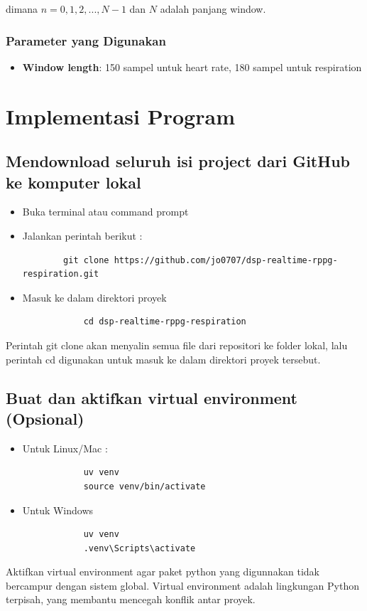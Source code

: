 \documentclass[11pt,a4paper]{article}
\begin{document}
dimana $n = 0, 1, 2, ..., N-1$ dan $N$ adalah panjang window.

\subsubsection{Parameter yang Digunakan}
\begin{itemize}
    \item \textbf{Window length}: 150 sampel untuk heart rate, 180 sampel untuk respiration
\end{itemize}


\section{Implementasi Program}

\subsection{Mendownload seluruh isi project dari GitHub ke komputer lokal}
    \begin{itemize}
        \item Buka terminal atau command prompt
        \item Jalankan perintah berikut : 
        \begin{lstlisting}
        git clone https://github.com/jo0707/dsp-realtime-rppg-respiration.git\end{lstlisting}
        \item Masuk ke dalam direktori proyek 
        \begin{lstlisting}
            cd dsp-realtime-rppg-respiration\end{lstlisting}
    \end{itemize}
    Perintah git clone akan menyalin semua file dari repositori ke folder lokal, lalu perintah cd digunakan untuk masuk ke dalam direktori proyek tersebut.

\subsection{Buat dan aktifkan virtual environment (Opsional)}
    \begin{itemize}
        \item Untuk Linux/Mac : 
        \begin{lstlisting}
            uv venv
            source venv/bin/activate\end{lstlisting}
        \item Untuk Windows
        \begin{lstlisting}
            uv venv
            .venv\Scripts\activate\end{lstlisting}\end{itemize}
    Aktifkan virtual environment agar paket python yang digunnakan tidak bercampur dengan sistem global. Virtual environment adalah lingkungan Python terpisah, yang membantu mencegah konflik antar proyek.
    
\end{document}
